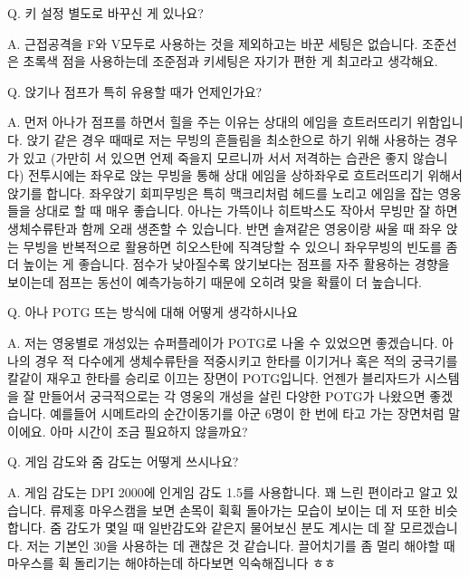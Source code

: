  

Q. 키 설정 별도로 바꾸신 게 있나요?

 

A. 근접공격을 F와 V모두로 사용하는 것을 제외하고는 바꾼 세팅은 없습니다. 조준선은 초록색 점을 사용하는데 조준점과 키세팅은 자기가 편한 게 최고라고 생각해요.

 

 

Q. 앉기나 점프가 특히 유용할 때가 언제인가요?

 

A. 먼저 아나가 점프를 하면서 힐을 주는 이유는 상대의 에임을 흐트러뜨리기 위함입니다. 앉기 같은 경우 때때로 저는 무빙의 흔들림을 최소한으로 하기 위해 사용하는 경우가 있고 (가만히 서 있으면 언제 죽을지 모르니까 서서 저격하는 습관은 좋지 않습니다) 전투시에는 좌우로 앉는 무빙을 통해 상대 에임을 상하좌우로 흐트러뜨리기 위해서 앉기를 합니다. 좌우앉기 회피무빙은 특히 맥크리처럼 헤드를 노리고 에임을 잡는 영웅들을 상대로 할 때 매우 좋습니다. 아나는 가뜩이나 히트박스도 작아서 무빙만 잘 하면 생체수류탄과 함께 오래 생존할 수 있습니다. 반면 솔져같은 영웅이랑 싸울 때 좌우 앉는 무빙을 반복적으로 활용하면 히오스탄에 직격당할 수 있으니 좌우무빙의 빈도를 좀 더 높이는 게 좋습니다. 점수가 낮아질수록 앉기보다는 점프를 자주 활용하는 경향을 보이는데 점프는 동선이 예측가능하기 때문에 오히려 맞을 확률이 더 높습니다.

 

 

Q. 아나 POTG 뜨는 방식에 대해 어떻게 생각하시나요

 

A. 저는 영웅별로 개성있는 슈퍼플레이가 POTG로 나올 수 있었으면 좋겠습니다. 아나의 경우 적 다수에게 생체수류탄을 적중시키고 한타를 이기거나 혹은 적의 궁극기를 칼같이 재우고 한타를 승리로 이끄는 장면이 POTG입니다. 언젠가 블리자드가 시스템을 잘 만들어서 궁극적으로는 각 영웅의 개성을 살린 다양한 POTG가 나왔으면 좋겠습니다. 예를들어 시메트라의 순간이동기를 아군 6명이 한 번에 타고 가는 장면처럼 말이에요. 아마 시간이 조금 필요하지 않을까요?

 

 

Q. 게임 감도와 줌 감도는 어떻게 쓰시나요?

 

A. 게임 감도는 DPI 2000에 인게임 감도 1.5를 사용합니다. 꽤 느린 편이라고 알고 있습니다. 류제홍 마우스캠을 보면 손목이 휙휙 돌아가는 모습이 보이는 데 저 또한 비슷합니다. 줌 감도가 몇일 때 일반감도와 같은지 물어보신 분도 계시는 데 잘 모르겠습니다. 저는 기본인 30을 사용하는 데 괜찮은 것 같습니다. 끌어치기를 좀 멀리 해야할 때 마우스를 휙 돌리기는 해야하는데 하다보면 익숙해집니다 ㅎㅎ

